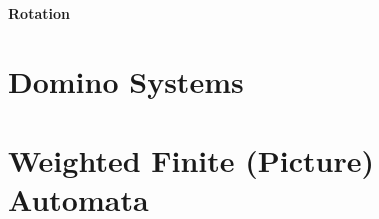 \documentclass{article}
\begin{document}
\paragraph{Rotation}

\section{Domino Systems}



\section{Weighted Finite (Picture) Automata}





\newpage
\nocite{*}


\end{document}
